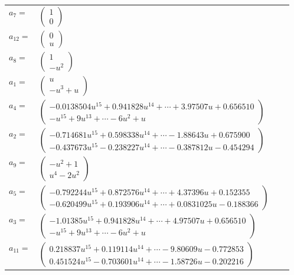 \documentclass[1p]{elsarticle_modified}
\theoremstyle{definition}
\begin{document}
\begin{tabular}{m{7pt} m{180pt} m{7pt} m{180pt} }
\flushright $a_{7}=$&$\begin{pmatrix}1\\0\end{pmatrix}$ \\
\flushright $a_{12}=$&$\begin{pmatrix}0\\u\end{pmatrix}$ \\
\flushright $a_{8}=$&$\begin{pmatrix}1\\- u^2\end{pmatrix}$ \\
\flushright $a_{1}=$&$\begin{pmatrix}u\\- u^3+u\end{pmatrix}$ \\
\flushright $a_{4}=$&$\begin{pmatrix}-0.0138504 u^{15}+0.941828 u^{14}+\cdots+3.97507 u+0.656510\\- u^{15}+9 u^{13}+\cdots-6 u^2+u\end{pmatrix}$ \\
\flushright $a_{2}=$&$\begin{pmatrix}-0.714681 u^{15}+0.598338 u^{14}+\cdots-1.88643 u+0.675900\\-0.437673 u^{15}-0.238227 u^{14}+\cdots-0.387812 u-0.454294\end{pmatrix}$ \\
\flushright $a_{9}=$&$\begin{pmatrix}- u^2+1\\u^4-2 u^2\end{pmatrix}$ \\
\flushright $a_{5}=$&$\begin{pmatrix}-0.792244 u^{15}+0.872576 u^{14}+\cdots+4.37396 u+0.152355\\-0.620499 u^{15}+0.193906 u^{14}+\cdots+0.0831025 u-0.188366\end{pmatrix}$ \\
\flushright $a_{3}=$&$\begin{pmatrix}-1.01385 u^{15}+0.941828 u^{14}+\cdots+4.97507 u+0.656510\\- u^{15}+9 u^{13}+\cdots-6 u^2+u\end{pmatrix}$ \\
\flushright $a_{11}=$&$\begin{pmatrix}0.218837 u^{15}+0.119114 u^{14}+\cdots-9.80609 u-0.772853\\0.451524 u^{15}-0.703601 u^{14}+\cdots-1.58726 u-0.202216\end{pmatrix}$ \\

\end{tabular}
\end{document}
